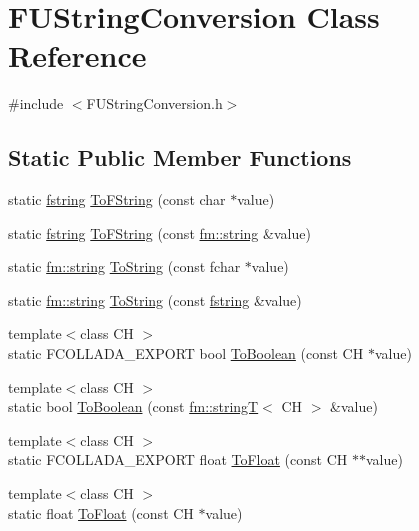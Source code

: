 \hypertarget{classFUStringConversion}{
\section{FUStringConversion Class Reference}
\label{classFUStringConversion}
}


{\ttfamily \#include $<$FUStringConversion.h$>$}

\subsection*{Static Public Member Functions}
\begin{DoxyCompactItemize}
\item 
static \hyperlink{classfm_1_1stringT}{fstring} \hyperlink{classFUStringConversion_abb4a873a6310c34c4c951622c84f72ef}{ToFString} (const char $\ast$value)
\item 
static \hyperlink{classfm_1_1stringT}{fstring} \hyperlink{classFUStringConversion_afba6f0ac783c8911b0a1d5e2713b8c01}{ToFString} (const \hyperlink{classfm_1_1stringT}{fm::string} \&value)
\item 
static \hyperlink{classfm_1_1stringT}{fm::string} \hyperlink{classFUStringConversion_a46a6ea46b0ef1785aa99be67ddc680a6}{ToString} (const fchar $\ast$value)
\item 
static \hyperlink{classfm_1_1stringT}{fm::string} \hyperlink{classFUStringConversion_a102f4876c446b316bcca24cba4d5d144}{ToString} (const \hyperlink{classfm_1_1stringT}{fstring} \&value)
\item 
{\footnotesize template$<$class CH $>$ }\\static FCOLLADA\_\-EXPORT bool \hyperlink{classFUStringConversion_a7d2dcd2a9d5c98f16e463132f7939994}{ToBoolean} (const CH $\ast$value)
\item 
{\footnotesize template$<$class CH $>$ }\\static bool \hyperlink{classFUStringConversion_a6b427938c96f5738d3f1ed3a8316a28f}{ToBoolean} (const \hyperlink{classfm_1_1stringT}{fm::stringT}$<$ CH $>$ \&value)
\item 
{\footnotesize template$<$class CH $>$ }\\static FCOLLADA\_\-EXPORT float \hyperlink{classFUStringConversion_a0a5ae1faadc37e1cc045b51a38ee986f}{ToFloat} (const CH $\ast$$\ast$value)
\item 
{\footnotesize template$<$class CH $>$ }\\static float \hyperlink{classFUStringConversion_abce4d1bee0fd3cf53b814b1b260b3869}{ToFloat} (const CH $\ast$value)
$$
\end{DoxyCompactItemize}
